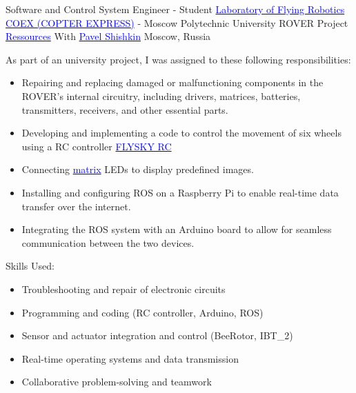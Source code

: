 \vspace{2mm}

    {Software and Control System Engineer - Student}
    {\href{https://mospolytech.ru/dovuzovskoe-obrazovanie/laboratoriya-letayushchej-robototekhniki/}{\textcolor{blue}{Laboratory of Flying Robotics COEX (COPTER EXPRESS)}} - Moscow Polytechnic University}
    {
    \newline
    ROVER Project
    \href{https://disk.yandex.ru/d/_G7udE6qSE2OYg}{\textcolor{blue}{Ressources}} With \href{https://t.me/PavelShi}{\textcolor{blue}{Pavel Shishkin}}
    }    
    {Moscow, Russia}
    {
    As part of an university project, I was assigned to these following responsibilities:
    \begin{itemize}
        \item Repairing and replacing damaged or malfunctioning components in the ROVER's internal circuitry, including drivers, matrices, batteries, transmitters, receivers, and other essential parts.
        \item Developing and implementing a code to control the movement of six wheels using a RC controller \href{https://clover.coex.tech/en/radio.html}{\textcolor{blue}{FLYSKY RC}}
        \item Connecting \href{https://learn.adafruit.com/32x16-32x32-rgb-led-matrix/how-the-matrix-works}{\textcolor{blue}{matrix}} LEDs to display predefined images.
        \item Installing and configuring ROS on a Raspberry Pi to enable real-time data transfer over the internet.
        \item Integrating the ROS system with an Arduino board to allow for seamless communication between the two devices.
    \end{itemize}
    \vspace{2mm}
    Skills Used:
    \begin{itemize}
        \item Troubleshooting and repair of electronic circuits
        \item Programming and coding (RC controller, Arduino, ROS)
        \item Sensor and actuator integration and control (BeeRotor, IBT\_2)
        \item Real-time operating systems and data transmission
        \item Collaborative problem-solving and teamwork
    \end{itemize}
    }        


